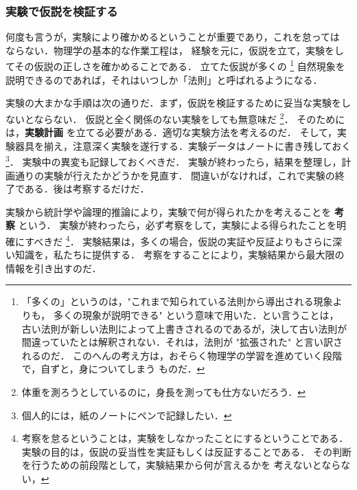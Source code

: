         \subsubsection{実験で仮説を検証する}
            何度も言うが，実験により確かめるということが重要であり，これを怠っては
            ならない．物理学の基本的な作業工程は，
            経験を元に，仮説を立て，実験をしてその仮説の正しさを確かめることである．
            立てた仮説が多くの
                \footnote{
                    「多くの」というのは，"これまで知られている法則から導出される現象よりも，
                     多くの現象が説明できる" という意味で用いた．とい言うことは，
                     古い法則が新しい法則によって上書きされるのであるが，決して古い法則が
                     間違っていたとは解釈されない．それは，法則が "拡張された" と言い訳されるのだ．
                     このへんの考え方は，おそらく物理学の学習を進めていく段階で，自ずと，身についてしまう
                     ものだ．
                }
            自然現象を説明できるのであれば，それはいつしか「法則」と呼ばれるようになる．

            実験の大まかな手順は次の通りだ．まず，仮説を検証するために妥当な実験をしないとならない．
            仮説と全く関係のない実験をしても無意味だ
                \footnote{
                    体重を測ろうとしているのに，身長を測っても仕方ないだろう．
                }．
            そのためには，\textbf{実験計画} を立てる必要がある．適切な実験方法を考えるのだ．
            そして，実験器具を揃え，注意深く実験を遂行する．実験データはノートに書き残しておく
                \footnote{
                    個人的には，紙のノートにペンで記録したい．
                }．
            実験中の異変も記録しておくべきだ．
            実験が終わったら，結果を整理し，計画通りの実験が行えたかどうかを見直す．
            間違いがなければ，これで実験の終了である．後は考察するだけだ．

            実験から統計学や論理的推論により，実験で何が得られたかを考えることを \textbf{考察} という．
            実験が終わったら，必ず考察をして，実験による得られたことを明確にすべきだ
                \footnote{
                    考察を怠るということは，実験をしなかったことにするということである．
                    実験の目的は，仮説の妥当性を実証もしくは反証することである．
                    その判断を行うための前段階として，実験結果から何が言えるかを
                    考えないとならない，
                }．
            実験結果は，多くの場合，仮説の実証や反証よりもさらに深い知識を，私たちに提供する．
            考察をすることにより，実験結果から最大限の情報を引き出すのだ．

